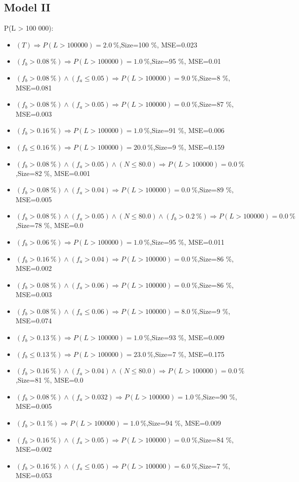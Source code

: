 \documentclass[numbered]{CSL}
\begin{document}
\subsection{Model II}
P(L > 100 000):
\begin{itemize}
\item $(T) \Rightarrow P(L > 100 000) = 2.0~\%$,\hfill Size=100 \%, MSE=0.023
\item $(f_b > 0.08~\%) \Rightarrow P(L > 100 000) = 1.0~\%$,\hfill Size=95 \%, MSE=0.01
\item $(f_b > 0.08~\%) \land (f_a \leq 0.05) \Rightarrow P(L > 100 000) = 9.0~\%$,\hfill Size=8 \%, MSE=0.081
\item $(f_b > 0.08~\%) \land (f_a > 0.05) \Rightarrow P(L > 100 000) = 0.0~\%$,\hfill Size=87 \%, MSE=0.003
\item $(f_b > 0.16~\%) \Rightarrow P(L > 100 000) = 1.0~\%$,\hfill Size=91 \%, MSE=0.006
\item $(f_b \leq 0.16~\%) \Rightarrow P(L > 100 000) = 20.0~\%$,\hfill Size=9 \%, MSE=0.159
\item $(f_b > 0.08~\%) \land (f_a > 0.05) \land (N \leq 80.0) \Rightarrow P(L > 100 000) = 0.0~\%$,\hfill Size=82 \%, MSE=0.001
\item $(f_b > 0.08~\%) \land (f_a > 0.04) \Rightarrow P(L > 100 000) = 0.0~\%$,\hfill Size=89 \%, MSE=0.005
\item $(f_b > 0.08~\%) \land (f_a > 0.05) \land (N \leq 80.0) \land (f_b > 0.2~\%) \Rightarrow P(L > 100 000) = 0.0~\%$,\hfill Size=78 \%, MSE=0.0
\item $(f_b > 0.06~\%) \Rightarrow P(L > 100 000) = 1.0~\%$,\hfill Size=95 \%, MSE=0.011
\item $(f_b > 0.16~\%) \land (f_a > 0.04) \Rightarrow P(L > 100 000) = 0.0~\%$,\hfill Size=86 \%, MSE=0.002
\item $(f_b > 0.08~\%) \land (f_a > 0.06) \Rightarrow P(L > 100 000) = 0.0~\%$,\hfill Size=86 \%, MSE=0.003
\item $(f_b > 0.08~\%) \land (f_a \leq 0.06) \Rightarrow P(L > 100 000) = 8.0~\%$,\hfill Size=9 \%, MSE=0.074
\item $(f_b > 0.13~\%) \Rightarrow P(L > 100 000) = 1.0~\%$,\hfill Size=93 \%, MSE=0.009
\item $(f_b \leq 0.13~\%) \Rightarrow P(L > 100 000) = 23.0~\%$,\hfill Size=7 \%, MSE=0.175
\item $(f_b > 0.16~\%) \land (f_a > 0.04) \land (N \leq 80.0) \Rightarrow P(L > 100 000) = 0.0~\%$,\hfill Size=81 \%, MSE=0.0
\item $(f_b > 0.08~\%) \land (f_a > 0.032) \Rightarrow P(L > 100 000) = 1.0~\%$,\hfill Size=90 \%, MSE=0.005
\item $(f_b > 0.1~\%) \Rightarrow P(L > 100 000) = 1.0~\%$,\hfill Size=94 \%, MSE=0.009
\item $(f_b > 0.16~\%) \land (f_a > 0.05) \Rightarrow P(L > 100 000) = 0.0~\%$,\hfill Size=84 \%, MSE=0.002
\item $(f_b > 0.16~\%) \land (f_a \leq 0.05) \Rightarrow P(L > 100 000) = 6.0~\%$,\hfill Size=7 \%, MSE=0.053
\end{itemize}
\end{document}
